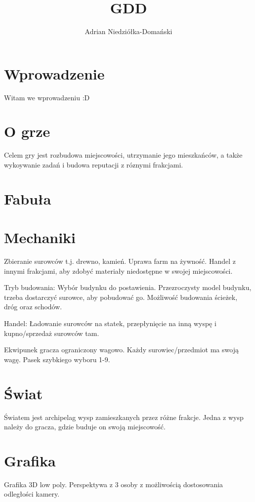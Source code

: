 \documentclass[12pt]{article}
\author{Adrian Niedziółka-Domański}
\title {GDD}
\begin{document}
	\maketitle
	\pagebreak
	\tableofcontents
	\pagebreak
	
	\section{Wprowadzenie}
	Witam we wprowadzeniu :D
	
	\section{O grze}
	Celem gry jest rozbudowa miejscowości, utrzymanie jego mieszkańców, a także wykoywanie zadań i budowa reputacji z róznymi frakcjami.
	\section{Fabuła}
	
	\section{Mechaniki}
	Zbieranie surowców t.j. drewno, kamień. Uprawa farm na żywność. Handel z innymi frakcjami, aby zdobyć materiały niedostępne w swojej miejscowości.
	
	Tryb budowania: Wybór budynku do postawienia. Przezroczysty model budynku, trzeba dostarczyć surowce, aby pobudować go. Możliwość budowania ścieżek, dróg oraz schodów.
	
	Handel: Ładowanie surowców na statek, przepłynięcie na inną wyspę i kupno/sprzedaż surowców tam.
	
	Ekwipunek gracza ograniczony wagowo. Każdy surowiec/przedmiot ma swoją wagę. Pasek szybkiego wyboru 1-9.
	\section{Świat}
	Światem jest archipelag wysp zamieszkanych przez różne frakcje. Jedna z wysp należy do gracza, gdzie buduje on swoją miejscowość.
	\section{Grafika}
	Grafika 3D low poly. Perspektywa z 3 osoby z możliwością dostosowania odległości kamery.
\end{document}
